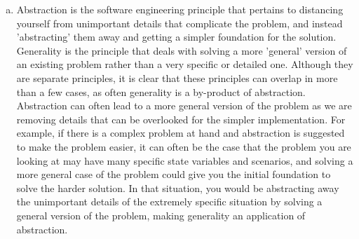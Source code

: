 \documentclass[12pt]{article}
\begin{document}
\begin{enumerate}[a)]
\item Abstraction is the software engineering principle that pertains to distancing yourself from unimportant details that complicate the problem, and instead 'abstracting' them away and getting a simpler foundation for the solution. Generality is the principle that deals with solving a more 'general' version of an existing problem rather than a very specific or detailed one. Although they are separate principles, it is clear that these principles can overlap in more than a few cases, as often generality is a by-product of abstraction. Abstraction can often lead to a more general version of the problem as we are removing details that can be overlooked for the simpler implementation. For example, if there is a complex problem at hand and abstraction is suggested to make the problem easier, it can often be the case that the problem you are looking at may have many specific state variables and scenarios, and solving a more general case of the problem could give you the initial foundation to solve the harder solution. In that situation, you would be abstracting away the unimportant details of the extremely specific situation by solving a general version of the problem, making generality an application of abstraction.

\end{enumerate}
\end{document}
